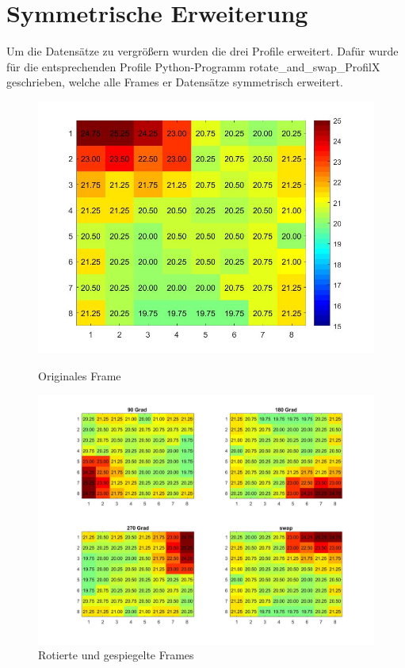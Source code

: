 \section{Symmetrische Erweiterung}

Um die Datensätze zu vergrößern wurden die drei Profile erweitert. Dafür wurde für die entsprechenden Profile Python-Programm rotate\_and\_swap\_ProfilX  geschrieben, welche alle Frames er Datensätze symmetrisch erweitert.  

\begin{figure}[!ht]
	\centering
	\begin{minipage}[c]{0.35\linewidth}
	\centering
	\includegraphics[width=.8\linewidth]{fig/original}
	\caption{Originales Frame}
	\label{fig:original}
	\end{minipage}
	\hfill
	\begin{minipage}[c]{0.6\linewidth  }
\includegraphics[width=1\linewidth]{fig/rotated}
\caption{Rotierte und gespiegelte Frames}
\label{fig:rotated}
	\end{minipage}
\end{figure}


